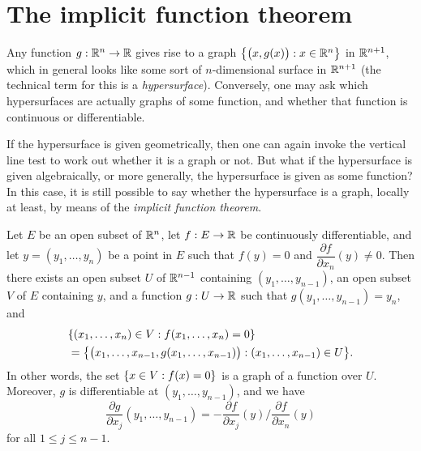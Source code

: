 \section{The implicit function theorem}\label{ii:sec:6.8}

\begin{note}
  Any function \(g : \mathbb{R}^n \to \mathbb{R}\) gives rise to a graph \(\left\lbrace\big(x, g(x)\big) : x \in \mathbb{R}^n\right\rbrace\) in \(\mathbb{R}^{n + 1}\), which in general looks like some sort of \(n\)-dimensional surface in \(\mathbb{R}^{n + 1}\)
  (the technical term for this is a \emph{hypersurface}).
  Conversely, one may ask which hypersurfaces are actually graphs of some function, and whether that function is continuous or differentiable.
\end{note}

\begin{note}
  If the hypersurface is given geometrically, then one can again invoke the vertical line test to work out whether it is a graph or not.
  But what if the hypersurface is given algebraically, or more generally, the hypersurface is given as some function?
  In this case, it is still possible to say whether the hypersurface is a graph, locally at least, by means of the \emph{implicit function theorem}.
\end{note}

\begin{thm}\label{ii:6.8.1}
  Let \(E\) be an open subset of \(\mathbb{R}^n\), let \(f : E \to \mathbb{R}\) be continuously differentiable, and let \(y = (y_1, \dots, y_n)\) be a point in \(E\) such that \(f(y) = 0\) and \(\dfrac{\partial f}{\partial x_n}(y) \neq 0\).
  Then there exists an open subset \(U\) of \(\mathbb{R}^{n - 1}\) containing \((y_1, \dots, y_{n - 1})\), an open subset \(V\) of \(E\) containing \(y\), and a function \(g : U \to \mathbb{R}\) such that \(g(y_1, \dots, y_{n - 1}) = y_n\), and
  \begin{align*}
     & \set{(x_1, \dots, x_n) \in V : f(x_1, \dots, x_n) = 0}                                             \\
     & = \set{\big(x_1, \dots, x_{n - 1}, g(x_1, \dots, x_{n - 1})\big) : (x_1, \dots, x_{n - 1}) \in U}.
  \end{align*}
  In other words, the set \(\left\lbrace x \in V : f(x) = 0\right\rbrace\) is a graph of a function over \(U\).
  Moreover, \(g\) is differentiable at \((y_1, \dots, y_{n - 1})\), and we have
  \[
    \dfrac{\partial g}{\partial x_j}(y_1, \dots, y_{n - 1}) = -\dfrac{\partial f}{\partial x_j}(y) / \dfrac{\partial f}{\partial x_n}(y) \tag{6.1}\label{ii:eq 6.1}
  \]
  for all \(1 \leq j \leq n - 1\).
\end{thm}

